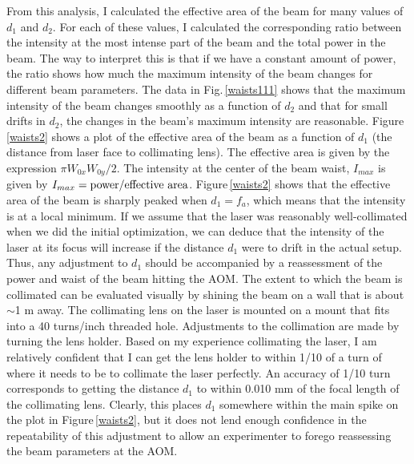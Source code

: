 From this analysis, I calculated the effective area of the beam for many values of $d_1$ and $d_2$. For each of these values, I calculated the corresponding ratio between the intensity at the most intense part of the beam and the total power in the beam. The way to interpret this is that if we have a constant amount of power, the ratio shows how much the maximum intensity of the beam changes for different beam parameters. The data in Fig.\,\ref{waists111} shows that the maximum intensity of the beam changes smoothly as a function of $d_2$ and that for small drifts in $d_2$, the changes in the beam's maximum intensity are reasonable. 
Figure\,\ref{waists2} shows a plot of the effective area of the beam as a function of $d_1$ (the distance from laser face to collimating lens). The effective area is given by the expression $\pi W_{0x}W_{0y}/2$. The intensity at the center of the beam waist, $I_{max}$ is given by $I_{max}=\textnormal{power}/\textnormal{effective area}$. Figure\,\ref{waists2} shows that the effective area of the beam is sharply peaked when $d_1=f_a$, which means that the intensity is at a local minimum. If we assume that the laser was reasonably well-collimated when we did the initial optimization, we can deduce that the intensity of the laser at its focus will increase if the distance $d_1$ were to drift in the actual setup. Thus, any adjustment to $d_1$ should be accompanied by a reassessment of the power and waist of the beam hitting the AOM. The extent to which the beam is collimated can be evaluated visually by shining the beam on a wall that is about $\sim$1 m away. The collimating lens on the laser is mounted on a mount that fits into a 40 turns/inch threaded hole. Adjustments to the collimation are made by turning the lens holder.  Based on my experience collimating the laser, I am relatively confident that I can get the lens holder to within 1/10 of a turn of where it needs to be to collimate the laser perfectly.  An accuracy of 1/10 turn corresponds to getting the distance $d_1$ to within 0.010 mm of the focal length of the collimating lens. Clearly, this places $d_1$ somewhere within the main spike on the plot in Figure\,\ref{waists2}, but it does not lend enough confidence in the repeatability of this adjustment to allow an experimenter to forego reassessing the beam parameters at the AOM. 

